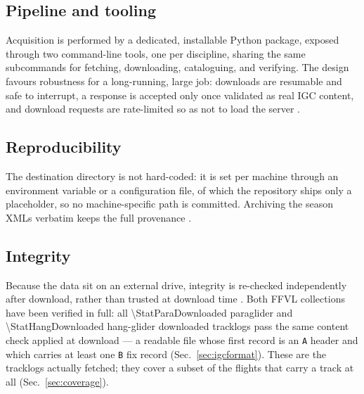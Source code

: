 \subsection{Pipeline and tooling}

Acquisition is performed by a dedicated, installable Python package, exposed through two
command-line tools, one per discipline, sharing the same subcommands for fetching,
downloading, cataloguing, and verifying. The design favours robustness for a
long-running, large job: downloads are resumable and safe to interrupt, a response is
accepted only once validated as real IGC content, and download requests are rate-limited
so as not to load the server .

\subsection{Reproducibility}

The destination directory is not hard-coded: it is set per machine through an environment
variable or a configuration file, of which the repository ships only a placeholder, so no
machine-specific path is committed. Archiving the season
XMLs verbatim keeps the full provenance .

\subsection{Integrity}

Because the data sit on an external drive, integrity is re-checked independently after
download, rather than trusted at download time . Both
FFVL collections have been verified in full: all \num{\StatParaDownloaded} paraglider and
\num{\StatHangDownloaded} hang-glider downloaded tracklogs pass the same content check
applied at download --- a readable file whose first record is an \texttt{A} header and which
carries at least one \texttt{B} fix record (Sec.~\ref{sec:igcformat}). These are the tracklogs actually fetched; they
cover a subset of the flights that carry a track at all (Sec.~\ref{sec:coverage}).

